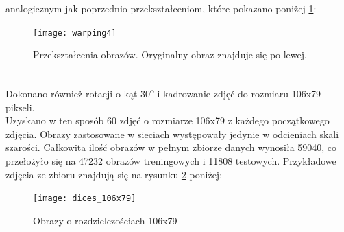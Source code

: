 analogicznym jak poprzednio przekształceniom, które pokazano poniżej \ref{fig:warping4}:
\begin{figure}[h!]
\centering
\texttt{[image: warping4]}
\caption{Przekształcenia obrazów. Oryginalny obraz znajduje się po lewej.}
\label{fig:warping4}
\end{figure}\\
Dokonano również rotacji o kąt 30\textsuperscript{o} i kadrowanie zdjęć do rozmiaru 106x79 pikseli.\\
Uzyskano w ten sposób 60 zdjęć o rozmiarze 106x79 z każdego początkowego zdjęcia.
Obrazy zastosowane w sieciach występowały jedynie w odcieniach skali szarości.
Całkowita ilość obrazów w pełnym zbiorze danych wynosiła 59040, co przełożyło się
na 47232 obrazów treningowych i 11808 testowych. Przykładowe zdjęcia ze zbioru znajdują
się na rysunku \ref{fig:rects} poniżej:

\begin{figure}[h!]
\centering
\texttt{[image: dices\_106x79]}
\caption{Obrazy o rozdzielczościach 106x79}
\label{fig:rects}
\end{figure}
